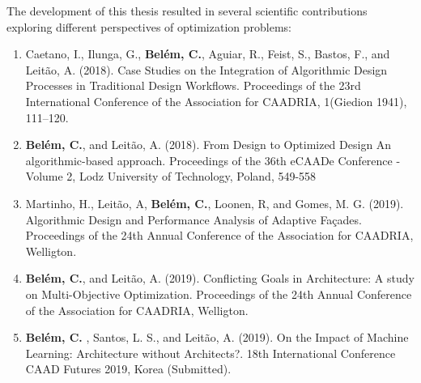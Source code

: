 The development of this thesis resulted in several scientific contributions exploring different perspectives of optimization problems:

\begin{enumerate}
\item Caetano, I., Ilunga, G., \textbf{Belém, C.}, Aguiar, R., Feist, S., Bastos, F., and Leitão, A. (2018). Case Studies on the Integration of Algorithmic Design Processes in Traditional Design Workflows. Proceedings of the 23rd International Conference of the Association for CAADRIA, 1(Giedion 1941), 111–120.

\item \textbf{Belém, C.}, and Leitão, A. (2018). From Design to Optimized Design An algorithmic-based approach. Proceedings of the 36th eCAADe Conference - Volume 2, Lodz University of Technology, Poland, 549-558

\item Martinho, H., Leitão, A, \textbf{Belém, C.}, Loonen, R, and Gomes, M. G. (2019). Algorithmic Design and Performance Analysis of Adaptive Façades. Proceedings of the 24th Annual Conference of the Association for CAADRIA, Welligton.

\item \textbf{Belém, C.}, and Leitão, A. (2019). Conflicting Goals in Architecture: A study on Multi-Objective Optimization. Proceedings of the 24th Annual Conference of the Association for CAADRIA, Welligton.

\item \textbf{Belém, C.}	, Santos, L. S., and Leitão, A. (2019). On the Impact of Machine Learning: Architecture without Architects?. 18th International Conference CAAD Futures 2019, Korea (Submitted).


\end{enumerate}



